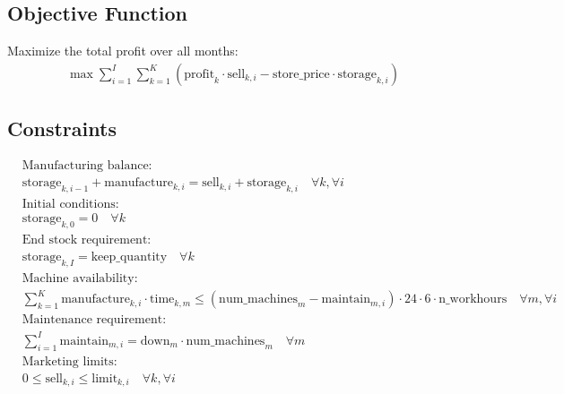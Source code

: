 \documentclass{article}
\begin{document}
\subsection*{Objective Function}
Maximize the total profit over all months:
\begin{align*}
\max \sum_{i=1}^{I} \sum_{k=1}^{K} \left(\text{profit}_k \cdot \text{sell}_{k,i} - \text{store\_price} \cdot \text{storage}_{k,i}\right)
\end{align*}

\subsection*{Constraints}
\begin{align*}
& \text{Manufacturing balance:} \\
& \text{storage}_{k,i-1} + \text{manufacture}_{k,i} = \text{sell}_{k,i} + \text{storage}_{k,i} \quad \forall k, \forall i \\
& \text{Initial conditions:} \\
& \text{storage}_{k,0} = 0 \quad \forall k \\
& \text{End stock requirement:} \\
& \text{storage}_{k,I} = \text{keep\_quantity} \quad \forall k \\
& \text{Machine availability:} \\
& \sum_{k=1}^{K} \text{manufacture}_{k,i} \cdot \text{time}_{k,m} \leq (\text{num\_machines}_m - \text{maintain}_{m,i}) \cdot 24 \cdot 6 \cdot \text{n\_workhours} \quad \forall m, \forall i \\
& \text{Maintenance requirement:} \\
& \sum_{i=1}^{I} \text{maintain}_{m,i} = \text{down}_m \cdot \text{num\_machines}_m \quad \forall m \\
& \text{Marketing limits:} \\
& 0 \leq \text{sell}_{k,i} \leq \text{limit}_{k,i} \quad \forall k, \forall i \\
\end{align*}
\end{document}
